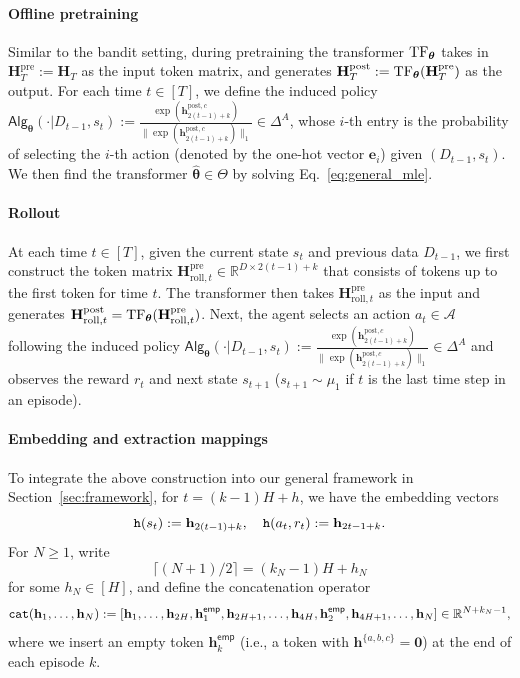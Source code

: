 \documentclass[10pt]{article}
\newcommand{\<}{\left\langle}
\renewcommand{\>}{\right\rangle}
\newcommand{\TF}{{\rm TF}}
\newcommand{\bzero}{{\mathbf 0}}
\newcommand{\R}{\mathbb{R}}
\newcommand{\pre}{{\mathrm{pre}}}
\newcommand{\post}{{\mathrm{post}}}
\newcommand{\parta}{{a}}
\newcommand{\partb}{{b}}
\newcommand{\partc}{{c}}
\newcommand{\state}{{s}}
\newcommand{\action}{{a}}
\newcommand{\reward}{{r}}
\newcommand{\totlen}{{T}}
\newcommand{\cat}{{\tt cat}}
\newcommand{\embedmap}{{\tt h}}
\newcommand{\sAlg}{{\mathsf{Alg}}}
\newcommand{\dset}{{D}}
\newcommand{\esttfpar}{{\widehat{\btheta}}}
\newcommand{\horizon}{{H}}
\newcommand{\actionsp}{{\mathcal{A}}}
\renewcommand{\horizon}{{H}}
\newcommand{\init}{{\mu_1}}
\newcommand{\tfpar}{{\btheta}}
\newcommand{\tfparspace}{{\Theta}}
\newcommand{\roll}{{\mathrm{roll}}}
\newcommand{\Numact}{{A}}
\newcommand{\emp}{{\mathsf{emp}}}
\def\bH{{\mathbf H}}
\def\btheta{{\boldsymbol \theta}}
\def\be{{\mathbf e}}
\def\bh{{\mathbf h}}
\begin{document}
\paragraph{Offline pretraining}
Similar to the bandit setting, during
pretraining the transformer $\TF_\tfpar$ takes in   $\bH_\totlen^\pre:=\bH_\totlen$ as the input token matrix, and generates $\bH_\totlen^\post:=\TF_\tfpar(\bH_\totlen^\pre)$ as the output. For each time $t\in[\totlen]$, we define the  induced policy  $\sAlg_\tfpar(\cdot|\dset_{t-1},\state_t):=\frac{\exp(\bh^{\post,\partc}_{2(t-1)+k})}{\|\exp(\bh^{\post,\partc}_{2(t-1)+k})\|_1}\in\Delta^\Numact$, whose $i$-th entry is the probability of selecting the $i$-th action (denoted by the  one-hot vector $\be_i$) given $(\dset_{t-1},\state_t)$. We then find the transformer $\esttfpar\in\tfparspace$ by solving Eq.~\eqref{eq:general_mle}.

\paragraph{Rollout}
At each time $t\in[\totlen]$, given the  current state $\state_t$ and  previous data $\dset_{t-1}$, we first construct the token matrix $\bH^{\pre}_{\roll,t}\in\R^{D\times 2(t-1)+k}$ that consists of tokens up to the first token for time $t$.   The transformer then takes $\bH^{\pre}_{\roll,t}$ as the input  and generates $\bH^{\post}_{\roll,t}=\TF_\tfpar(\bH^{\pre}_{\roll,t})$. Next,  the agent selects an action $\action_t\in\actionsp$ following  the induced  policy $\sAlg_\tfpar(\cdot|\dset_{t-1},\state_t):=\frac{\exp(\bh^{\post,\partc}_{2(t-1)+k})}{\|\exp(\bh^{\post,\partc}_{2(t-1)+k})\|_1}\in\Delta^\Numact$ and observes the reward $\reward_t$ and next state $\state_{t+1}$ ($\state_{t+1}\sim\init$ if $t$ is the last time step in an episode).





\paragraph{Embedding and extraction mappings}
To integrate the above construction into our general framework in Section~\ref{sec:framework}, for $t=(k-1)\horizon+h$,  we have the embedding vectors $$\embedmap(\state_t):=\bh_{2(t-1)+k},~~~\embedmap(\action_t,\reward_t):=\bh_{2t-1+k}.$$  For $N\geq 1$, write $$\lceil(N+1)/2\rceil=(k_N-1)\horizon+h_N$$ for some $h_N\in[\horizon]$, and define the  concatenation operator
\begin{align*}
\cat(\bh_1, \ldots, \bh_N): = [\bh_1, \ldots,\bh_{2\horizon},\bh_{1}^{\emp}, \bh_{2\horizon+1},\ldots,\bh_{4\horizon},\bh_2^\emp,\bh_{4\horizon+1},\ldots, \bh_N]\in\R^{N+k_N-1},
\end{align*}
where we insert an empty token $\bh_k^\emp$ (i.e., a token with $\bh^{\{\parta,\partb,\partc\}}=\bzero$) at the end of  each episode $k$.
\end{document}
